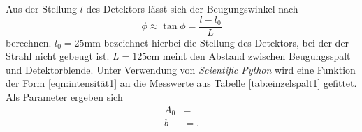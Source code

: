 \noindent
Aus der Stellung $l$ des Detektors lässt sich der Beugungswinkel nach
\begin{equation}
  \label{eqn:phiausw}
    \phi \approx \tan{\phi} = \frac{l-l_0}{L}
\end{equation}
berechnen. $l_0 = 25 \si{\milli\meter}$ bezeichnet hierbei die Stellung des Detektors, bei der der Strahl
nicht gebeugt ist. $L = 125 \si{\centi\meter}$ meint den Abstand zwischen Beugungsspalt und Detektorblende.
Unter Verwendung von \textit{Scientific Python} wird eine Funktion der Form \eqref{eqn:intensität1}
an die Messwerte aus Tabelle \ref{tab:einzelspalt1} gefittet. Als Parameter ergeben sich
\begin{align*}
  A_0 & = \\
  b   & = .
\end{align*}

